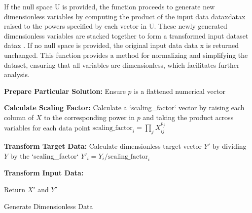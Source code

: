 \documentclass{article}
\begin{document}
If the null space U is provided, the function proceeds to generate new dimensionless variables by computing the product of the input data dataxdatax​ raised to the powers specified by each vector in U. These newly generated dimensionless variables are stacked together to form a transformed input dataset datax . If no null space is provided, the original input data data x is returned unchanged. This function provides a method for normalizing and simplifying the dataset, ensuring that all variables are dimensionless, which facilitates further analysis.\\



\begin{algorithm}[H]
\SetAlgoLined
{}

\textbf{Prepare Particular Solution:}\;
Ensure \(p\) is a flattened numerical vector\;

\textbf{Calculate Scaling Factor:}\;
Calculate a `scaling_factor` vector by raising each column of \(X\) to the corresponding power in \(p\) and taking the product across variables for each data point\;
\( \text{scaling\_factor}_i = \prod_{j} X_{ij}^{p_j} \)\;

\textbf{Transform Target Data:}\;
Calculate dimensionless target vector \(Y'\) by dividing \(Y\) by the `scaling_factor`\;
\( Y'_i = Y_i / \text{scaling\_factor}_i \)\;

\textbf{Transform Input Data:}\;

Return \(X'\) and \(Y'\)\;

\caption{Generate Dimensionless Data}
\label{alg:generate_dimensionless_data} %
\end{algorithm}\\
\end{document}
